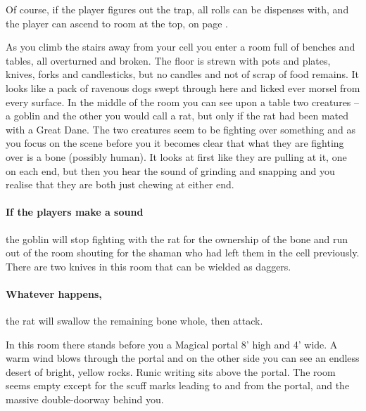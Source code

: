 \begin{multicols}{2}
Of course, if the player figures out the trap, all rolls can be dispenses with, and the player can ascend to room at the top, on page \pageref{laddertop}.


\begin{boxtext}

	As you climb the stairs away from your cell you enter a room full of benches and tables, all overturned and broken. 
	The floor is strewn with pots and plates, knives, forks and candlesticks, but no candles and not of scrap of food remains.
	It looks like a pack of ravenous dogs swept through here and licked ever morsel from every surface.
	In the middle of the room you can see upon a table two creatures -- a goblin and the other you would call a rat, but only if the rat had been mated with a Great Dane.
	The two creatures seem to be fighting over something and as you focus on the scene before you it becomes clear that what they are fighting over is a bone (possibly human).
	It looks at first like they are pulling at it, one on each end, but then you hear the sound of grinding and snapping and you realise that they are both just chewing at either end.

\end{boxtext}

\paragraph{If the players make a sound}
the goblin will stop fighting with the rat for the ownership of the bone and run out of the room shouting for the shaman who had left them in the cell previously.
There are two knives in this room that can be wielded as daggers.

\paragraph{Whatever happens,}
the rat will swallow the remaining bone whole, then attack.




\begin{boxtext}

	In this room there stands before you a Magical portal 8' high and 4' wide.
	A warm wind blows through the portal and on the other side you can see an endless desert of bright, yellow rocks.
	Runic writing sits above the portal.
	The room seems empty except for the scuff marks leading to and from the portal, and the massive double-doorway behind you. 


\end{boxtext}
\end{multicols}
